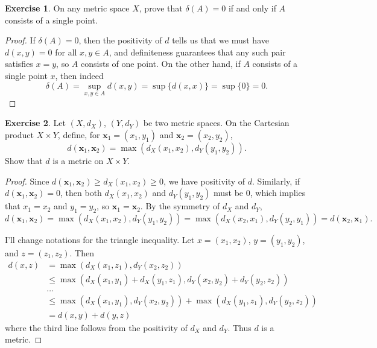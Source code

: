 \documentclass[12pt]{article}
\theoremstyle{definition}
\newtheorem{ex}{Exercise}
\begin{document}
\begin{ex}
	On any metric space $X$, prove that $\delta(A) = 0$ if and only if $A$ consists of a single point.
\end{ex}
\begin{proof}
	If $\delta(A) = 0$, then the positivity of $d$ tells us that we must have $d(x, y) = 0$ for all $x, y \in A$, and definiteness guarantees that any such pair satisfies $x = y$, so $A$ consists of one point. On the other hand, if $A$ consists of a single point $x$, then indeed \begin{equation*}
		\delta(A) = \sup_{x, y \in A} d(x, y) = \sup \lbrace d(x, x) \rbrace = \sup \lbrace 0 \rbrace = 0.
	\end{equation*}
\end{proof}

\begin{ex}
	Let $(X, d_X)$, $(Y, d_Y)$ be two metric spaces.
	On the Cartesian product $X \times Y$, define, for $\mathbf{x}_1 = (x_1, y_1)$ and $\mathbf{x}_2 = (x_2, y_2)$, \begin{equation*}
		d(\mathbf{x}_1, \mathbf{x}_2) = \max(d_X(x_1, x_2), d_Y(y_1, y_2)).
	\end{equation*}
	Show that $d$ is a metric on $X \times Y$.
\end{ex}
\begin{proof}
	Since $d(\mathbf{x}_1, \mathbf{x}_2) \geq d_X(x_1,x_2) \geq 0$, we have positivity of $d$.
	Similarly, if $d(\mathbf{x}_1, \mathbf{x}_2) = 0$, then both $d_X(x_1,x_2)$ and $d_Y(y_1,y_2)$ must be 0, which implies that $x_1=x_2$ and $y_1=y_2$, so $\mathbf{x}_1 = \mathbf{x}_2$.
	By the symmetry of $d_X$ and $d_Y$, \begin{equation*}
		d(\mathbf{x}_1, \mathbf{x}_2) = \max(d_X(x_1, x_2), d_Y(y_1, y_2)) = \max(d_X(x_2, x_1), d_Y(y_2, y_1)) = d(\mathbf{x}_2, \mathbf{x}_1).
	\end{equation*}

	I'll change notations for the triangle inequality.
	Let $x = (x_1, x_2)$, $y = (y_1, y_2)$, and $z = (z_1, z_2)$.
	Then \begin{align*}
		d(x, z) & = \max(d_X(x_1, z_1), d_Y(x_2, z_2))                                         \\
		        & \leq \max(d_X(x_1, y_1) + d_X(y_1, z_1), d_Y(x_2, y_2) + d_Y(y_2, z_2))      \\
		        & \dots                                                                        \\
		        & \leq \max(d_X(x_1, y_1), d_Y(x_2, y_2)) + \max(d_X(y_1, z_1), d_Y(y_2, z_2)) \\
		        & = d(x, y) + d(y, z)
	\end{align*}
  where the third line follows from the positivity of $d_X$ and $d_Y$.
  Thus $d$ is a metric.
\end{proof}
\end{document}
